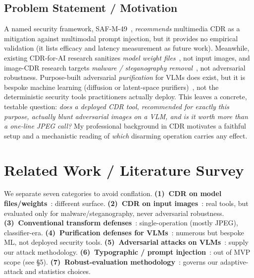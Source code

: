 \documentclass[11pt]{article}
\begin{document}
\subsection{Problem Statement / Motivation}
A named security framework, SAF-M-49~\cite{safm49}, \emph{recommends} multimedia
CDR as a mitigation against multimodal prompt injection, but it provides no
empirical validation (it lists efficacy and latency measurement as future work).
Meanwhile, existing CDR-for-AI research sanitizes \emph{model
weight files}~\cite{aimodelcdr,ztaicdr}, not input images, and image-CDR research
targets \emph{malware / steganography removal}~\cite{openimagecdr}, not
adversarial robustness. Purpose-built adversarial \emph{purification} for VLMs
does exist, but it is bespoke machine learning (diffusion or latent-space
purifiers)~\cite{nie2022diffpure,clipure2025,codefend2025}, not the deterministic
security tools practitioners actually deploy. This leaves a concrete, testable
question: \emph{does a deployed CDR tool, recommended for exactly this
purpose, actually blunt adversarial images on a VLM, and is it worth more than a
one-line JPEG call?} My professional background in CDR motivates a faithful setup
and a mechanistic reading of \emph{which} disarming operation carries any effect.

\section{Related Work / Literature Survey}
We separate seven categories to avoid conflation.
\textbf{(1)~CDR on model files/weights}~\cite{aimodelcdr,ztaicdr}: different
surface. \textbf{(2)~CDR on input images}~\cite{icdr,openimagecdr,dangerzone}:
real tools, but evaluated only for malware/steganography, never adversarial
robustness. \textbf{(3)~Conventional transform
defenses}~\cite{guo2018countering,shin2017jpegresistant}: single-operation
(mostly JPEG), classifier-era. \textbf{(4)~Purification defenses for
VLMs}~\cite{nie2022diffpure,clipure2025,codefend2025}: numerous but bespoke ML,
not deployed security tools. \textbf{(5)~Adversarial attacks on
VLMs}~\cite{qi2024visualaaai,univperturb2024}: supply our attack methodology.
\textbf{(6)~Typographic / prompt injection}~\cite{scenetap2024,jailbreaksurvey2024}:
out of MVP scope (see \S5). \textbf{(7)~Robust-evaluation
methodology}~\cite{athalye2018obfuscated,tramer2020adaptive,carlini2019evaluating}:
governs our adaptive-attack and statistics choices.
\end{document}
